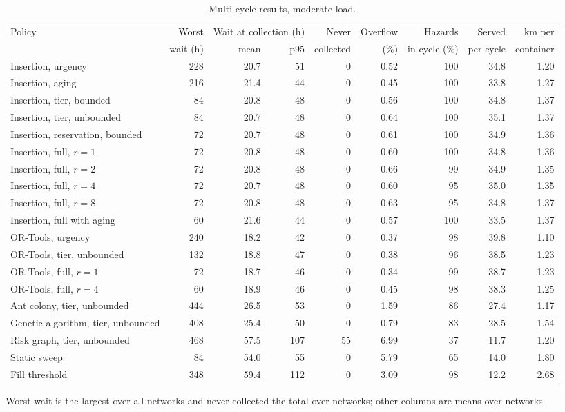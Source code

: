 \begin{table}[!htbp]
\caption{Multi-cycle results, moderate load.}
\label{tab:rollout_moderate}
\centering
\footnotesize
\setlength{\tabcolsep}{3pt}
\begin{tabular}{lrrrrrrrr}
\toprule
Policy & Worst & \multicolumn{2}{c}{Wait at collection (h)} & Never & Overflow & Hazards & Served & km per \\
\cmidrule(lr){3-4}
 & wait (h) & mean & p95 & collected & (\%) & in cycle (\%) & per cycle & container \\
\midrule
Insertion, urgency & 228 & 20.7 & 51 & 0 & 0.52 & 100 & 34.8 & 1.20 \\
Insertion, aging & 216 & 21.4 & 44 & 0 & 0.45 & 100 & 33.8 & 1.27 \\
Insertion, tier, bounded & 84 & 20.8 & 48 & 0 & 0.56 & 100 & 34.8 & 1.37 \\
Insertion, tier, unbounded & 84 & 20.7 & 48 & 0 & 0.64 & 100 & 35.1 & 1.37 \\
Insertion, reservation, bounded & 72 & 20.7 & 48 & 0 & 0.61 & 100 & 34.9 & 1.36 \\
Insertion, full, $r = 1$ & 72 & 20.8 & 48 & 0 & 0.60 & 100 & 34.8 & 1.36 \\
Insertion, full, $r = 2$ & 72 & 20.8 & 48 & 0 & 0.66 & 99 & 34.9 & 1.35 \\
Insertion, full, $r = 4$ & 72 & 20.7 & 48 & 0 & 0.60 & 95 & 35.0 & 1.35 \\
Insertion, full, $r = 8$ & 72 & 20.8 & 48 & 0 & 0.63 & 95 & 34.8 & 1.37 \\
Insertion, full with aging & 60 & 21.6 & 44 & 0 & 0.57 & 100 & 33.5 & 1.37 \\
OR-Tools, urgency & 240 & 18.2 & 42 & 0 & 0.37 & 98 & 39.8 & 1.10 \\
OR-Tools, tier, unbounded & 132 & 18.8 & 47 & 0 & 0.38 & 96 & 38.5 & 1.23 \\
OR-Tools, full, $r = 1$ & 72 & 18.7 & 46 & 0 & 0.34 & 99 & 38.7 & 1.23 \\
OR-Tools, full, $r = 4$ & 60 & 18.9 & 46 & 0 & 0.45 & 98 & 38.3 & 1.25 \\
Ant colony, tier, unbounded & 444 & 26.5 & 53 & 0 & 1.59 & 86 & 27.4 & 1.17 \\
Genetic algorithm, tier, unbounded & 408 & 25.4 & 50 & 0 & 0.79 & 83 & 28.5 & 1.54 \\
Risk graph, tier, unbounded & 468 & 57.5 & 107 & 55 & 6.99 & 37 & 11.7 & 1.20 \\
Static sweep & 84 & 54.0 & 55 & 0 & 5.79 & 65 & 14.0 & 1.80 \\
Fill threshold & 348 & 59.4 & 112 & 0 & 3.09 & 98 & 12.2 & 2.68 \\
\bottomrule
\end{tabular}
\par\smallskip\footnotesize Worst wait is the largest over all networks and never collected the total over networks; other columns are means over networks.
\end{table}
